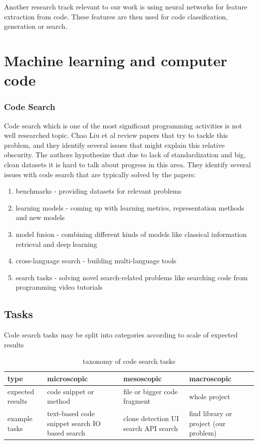 \documentclass[longabstract,mgr,english]{iithesis}
\begin{document}
Another research track relevant to our work is using neural networks for feature extraction from code. These features are then used for code classification, generation or search.

\section{Machine learning and computer code}

\subsubsection{Code Search}
Code search which is one of the most significant programming activities is not well researched topic. Chao Liu et al \cite{code_search} review papers that try to tackle this problem, and they identify several issues that might explain this relative obscurity. The authors hypothesize that due to lack of standardization and big, clean datasets it is hard to talk about progress in this area. They identify several issues with code search that are typically solved by the papers:

\begin{enumerate}
\label{codesearch}
    \item benchmarks - providing datasets for relevant problems
    \item learning models - coming up with learning metrics, representation methods and new models
    \item model fusion - combining different kinds of models like classical information retrieval and deep learning 
    \item cross-language search - building multi-language tools
    \item search tasks - solving novel search-related problems like searching code from programming video tutorials
\end{enumerate}


\subsection{Tasks}

Code search tasks may be split into categories according to scale of expected results

\begin{table}
  \caption{taxonomy of code search tasks}
  \centering
\begin{tabular}{|p{2cm}|p{4cm}|p{3cm}|p{4cm}|}
\hline
type & microscopic  & mesoscopic & macroscopic\\
\hline
expected results & code snippet or method & file or bigger code fragment & whole project\\
\hline
example tasks & text-based code snippet search \newline IO based search & clone detection \newline  UI search \newline API search  & find library or project (our problem) \\
\hline
\end{tabular}
\end{table}
\end{document}
